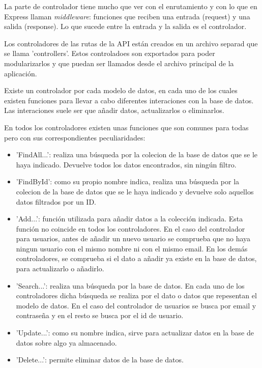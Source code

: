 \documentclass[a4paper, 12pt]{book}
\begin{document}
La parte de controlador tiene mucho que ver con el enrutamiento y con lo que en Express llaman \emph{middleware}: funciones que reciben una entrada (request) y una salida (response). Lo que sucede entre la entrada y la salida es el controlador.

Los controladores de las rutas de la API est\'an creados en un archivo separad que se llama 'controllers'. Estos controladoes son exportados para poder modularizarlos y que puedan ser llamados desde el archivo principal de la aplicaci\'on. 

Existe un controlador por cada modelo de datos, en cada uno de los cuales existen funciones para llevar a cabo diferentes interaciones con la base de datos. Las interaciones suele ser que a\~nadir datos, actualizarlos o eliminarlos.

En todos los controladores existen unas funciones que son comunes para todas pero con sus correspondientes peculiaridades:

\begin{itemize}
\item 'FindAll...': realiza una b\'usqueda por la colecion de la base de datos que se le haya indicado. Devuelve todos los datos encontrados, sin ning\'un filtro.

\item 'FindById': como su propio nombre indica, realiza una b\'usqueda por la colecion de la base de datos que se le haya indicado y devuelve solo aquellos datos filtrados por un ID.

\item 'Add...': funci\'on utilizada para a\~nadir datos a la colecci\'on indicada. Esta funci\'on no coincide en todos los controladores. En el caso del controlador para usuarios, antes de a\~nadir un nuevo usuario se comprueba que no haya ningun usuario con el mismo nombre ni con el mismo email. En los dem\'as controladores, se comprueba si el dato a a\~nadir ya existe en la base de datos, para actualizarlo o a\~nadirlo.

\item 'Search...': realiza una b\'usqueda por la base de datos. En cada uno de los controladores dicha b\'usqueda se realiza por el dato o datos que repesentan el modelo de datos. En el caso del controlador de usuarios se busca por email y contrase\~na y en el resto se busca por el id de usuario.

\item 'Update...': como su nombre indica, sirve para actualizar datos en la base de datos sobre algo ya almacenado.

\item 'Delete...': permite eliminar datos de la base de datos.

\end{itemize}
\end{document}
